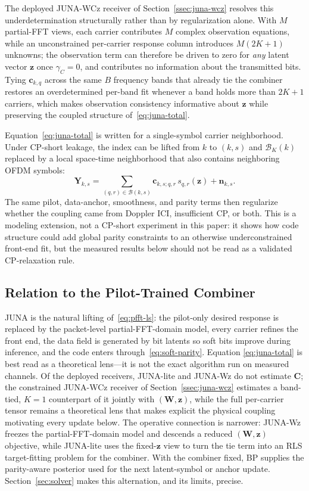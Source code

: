 \documentclass[journal]{IEEEtran}
\newcommand{\juna}{JUNA}
\newcommand{\junalite}{JUNA-lite}
\newcommand{\junawz}{JUNA-Wz}
\newcommand{\junawcz}{JUNA-WCz}
\begin{document}
The deployed \junawcz{} receiver of Section~\ref{ssec:juna-wcz} resolves this
underdetermination structurally rather than by regularization alone. With $M$
partial-FFT views, each carrier contributes $M$ complex observation equations,
while an unconstrained per-carrier response column introduces $M(2K{+}1)$
unknowns; the observation term can therefore be driven to zero for \emph{any}
latent vector $\mathbf z$ once $\gamma_C=0$, and contributes no information
about the transmitted bits. Tying $\mathbf c_{k,q}$ across the same $B$
frequency bands that already tie the combiner restores an overdetermined
per-band fit whenever a band holds more than $2K{+}1$ carriers, which makes
observation consistency informative about $\mathbf z$ while preserving the
coupled structure of~\eqref{eq:juna-total}.

Equation~\eqref{eq:juna-total} is written for a single-symbol carrier
neighborhood. Under CP-short leakage, the index can be lifted from $k$ to
$(k,s)$ and $\mathcal B_K(k)$ replaced by a local space-time neighborhood that
also contains neighboring OFDM symbols:
\begin{equation}
  \mathbf Y_{k,s}
  =\sum_{(q,r)\in\mathcal B(k,s)}
      \mathbf c_{k,s;q,r}\,s_{q,r}(\mathbf z)+\mathbf n_{k,s}.
  \label{eq:space-time-coupling}
\end{equation}
The same pilot, data-anchor, smoothness, and parity terms then regularize
whether the coupling came from Doppler ICI, insufficient CP, or both. This is a
modeling extension, not a CP-short experiment in this paper: it shows how code
structure could add global parity constraints to an otherwise underconstrained
front-end fit, but the measured results below should not be read as a validated
CP-relaxation rule.

\subsection{Relation to the Pilot-Trained Combiner}\label{ssec:juna-relation}
\juna{} is the natural lifting of~\eqref{eq:pfft-ls}: the pilot-only desired
response is replaced by the packet-level partial-FFT-domain model, every carrier refines the
front end, the data field is generated by bit latents so soft bits improve during
inference, and the code enters through~\eqref{eq:soft-parity}. Equation
\eqref{eq:juna-total} is best read as a theoretical lens---it is not the exact
algorithm run on measured channels. Of the deployed receivers, \junalite{} and
\junawz{} do not estimate $\mathbf C$; the constrained \junawcz{} receiver of
Section~\ref{ssec:juna-wcz} estimates a band-tied, $K{=}1$ counterpart of it
jointly with $(\mathbf W,\mathbf z)$, while the full per-carrier tensor remains
a theoretical lens that makes explicit the physical coupling motivating every
update below.
The operative connection is narrower: \junawz{} freezes the partial-FFT-domain model and
descends a reduced $(\mathbf W,\mathbf z)$ objective, while \junalite{} uses the
fixed-$\mathbf z$ view to turn the tie term into an RLS target-fitting problem
for the combiner. With the combiner fixed, BP supplies the parity-aware
posterior used for the next latent-symbol or anchor update.
Section~\ref{sec:solver} makes this alternation, and its limits, precise.
\end{document}
